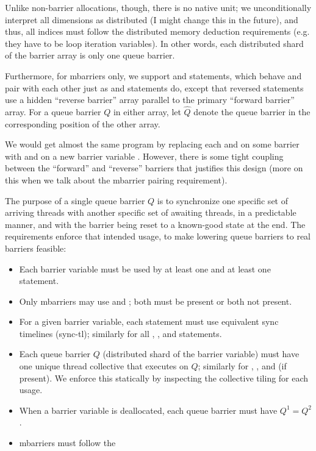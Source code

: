 

\filbreak
Unlike non-barrier allocations, though, there is no native unit; we unconditionally interpret all dimensions as distributed (I might change this in the future), and thus, all indices must follow the distributed memory deduction requirements (e.g. they have to be  loop iteration variables).
In other words, each distributed shard of the barrier array is only one queue barrier.

\filbreak
Furthermore, for mbarriers only, we support  and  statements, which behave and pair with each other just as  and  statements do, except that reversed statements use a hidden ``reverse barrier'' array parallel to the primary ``forward barrier'' array.
For a queue barrier $Q$ in either array, let $\widehat{Q}$ denote the queue barrier in the corresponding position of the other array.

\filbreak
We would get almost the same program by replacing each  and  on some barrier  with  and  on a new barrier variable .
However, there is some tight coupling between the ``forward'' and ``reverse'' barriers that justifies this design (more on this when we talk about the mbarrier pairing requirement).

\filbreak
{}

The purpose of a single queue barrier $Q$ is to synchronize one specific set of arriving threads with another specific set of awaiting threads, in a predictable manner, and with the barrier being reset to a known-good state at the end.
The requirements enforce that intended usage, to make lowering queue barriers to real barriers feasible:

\filbreak
\begin{itemize}
  \item Each barrier variable must be used by at least one  and at least one  statement.
  \filbreak
  \item Only mbarriers may use  and ; both must be present or both not present.
  \filbreak
  \item For a given barrier variable, each  statement must use equivalent sync timelines (sync-tl); similarly for all , , and  statements.
  \filbreak
  \item Each queue barrier $Q$ (distributed shard of the barrier variable) must have one unique thread collective that executes  on $Q$; similarly for , , and  (if present). We enforce this statically by inspecting the collective tiling for each usage.
  \filbreak
  \item When a barrier variable is deallocated, each queue barrier must have $Q^1 = Q^2$.
  \filbreak
  \item mbarriers must follow the 
\end{itemize}

